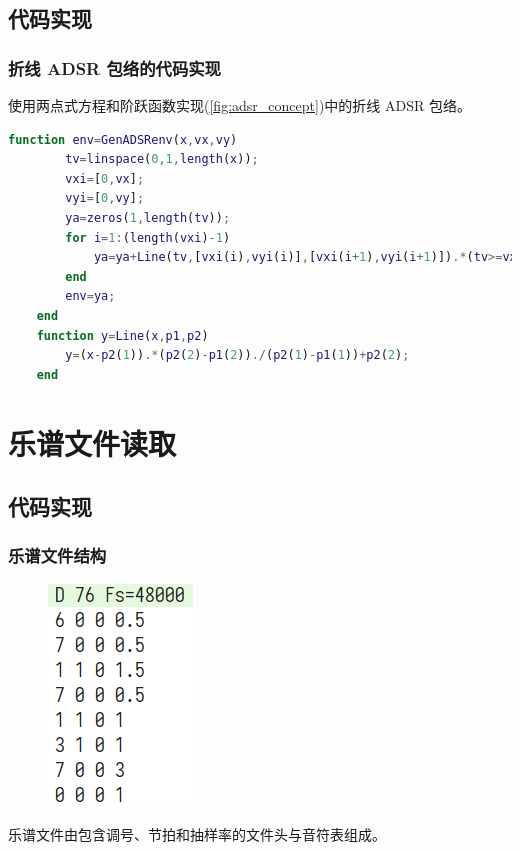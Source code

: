 \documentclass[utf8,10pt]{beamer}
\begin{document}
\subsection{代码实现}
\begin{frame}[fragile]
    \frametitle{折线 ADSR 包络的代码实现}

    使用两点式方程和阶跃函数实现(\ref{fig:adsr_concept})中的折线 ADSR 包络。

    \begin{lstlisting}[language=matlab,style=lgeneral,gobble=4]
    function env=GenADSRenv(x,vx,vy)
        tv=linspace(0,1,length(x));
        vxi=[0,vx];
        vyi=[0,vy];
        ya=zeros(1,length(tv));
        for i=1:(length(vxi)-1)
            ya=ya+Line(tv,[vxi(i),vyi(i)],[vxi(i+1),vyi(i+1)]).*(tv>=vxi(i)&tv<vxi(i+1));
        end
        env=ya;
    end
    function y=Line(x,p1,p2)
        y=(x-p2(1)).*(p2(2)-p1(2))./(p2(1)-p1(1))+p2(2);
    end
    \end{lstlisting}

\end{frame}

\section{乐谱文件读取}

\subsection{代码实现}
\begin{frame}
    \frametitle{乐谱文件结构}

    \begin{figure}[htpb]
        \centering
        \includegraphics[height=0.6\textheight]{figures/20221117132924.png}
    \end{figure}

    乐谱文件由包含调号、节拍和抽样率的文件头与音符表组成。

\end{frame}
\end{document}
